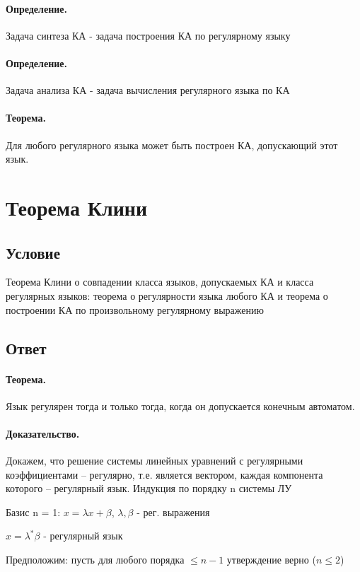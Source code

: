 \documentclass{report}
\begin{document}
\paragraph*{Определение.}
Задача синтеза КА - задача построения КА по регулярному языку

\paragraph*{Определение.}
Задача анализа КА - задача вычисления регулярного языка по КА

\paragraph*{Теорема.}
Для любого регулярного языка может быть построен КА, допускающий этот язык.

\newpage

\section{Теорема Клини}
\subsection{Условие}
Теорема Клини о совпадении класса языков, допускаемых КА и класса регулярных
языков: теорема о регулярности языка любого КА и теорема о построении КА по
произвольному регулярному выражению

\subsection{Ответ}
\paragraph*{Теорема.}
Язык регулярен тогда и только тогда, когда он допускается конечным автоматом.
\paragraph*{Доказательство.}
Докажем, что решение системы линейных уравнений с
регулярными коэффициентами – регулярно, т.е. является
вектором, каждая компонента которого – регулярный язык.
Индукция по порядку n системы ЛУ

Базис n = 1: $x = \lambda x + \beta$,  $\lambda,\beta$ - рег. выражения

 $x=\lambda^{*}\beta$ - регулярный язык


Предположим: пусть для любого порядка $\le  n - 1$ утверждение верно ($n \le 2$)
\end{document}
